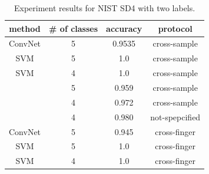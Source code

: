 \begin{table}[!ht]
	\centering
	\caption{Experiment results for NIST SD4 with two labels.}
	\label{tab.SD4_result_two_labels}
	\begin{tabular}{|c|c|c|c|}
		\hline
		\textbf{method} & \textbf{\# of classes} & \textbf{accuracy} & \textbf{protocol} \\ \hline
		ConvNet & 5 & 0.9535 & cross-sample \\ \hline
		SVM & 5 & 1.0 & cross-sample \\ \hline
		SVM & 4 & 1.0 & cross-sample \\ \hline
		\cite{cao2013fingerprint} & 5 & 0.959 & cross-sample \\ \hline
		\cite{cao2013fingerprint}& 4 & 0.972 & cross-sample \\ \hline
		\cite{wang2014fingerprint} & 4 & 0.980 & not-spepcified \\ \hline
		ConvNet & 5 & 0.945 & cross-finger \\ \hline
		SVM & 5 & 1.0 & cross-finger \\ \hline
		SVM & 4 & 1.0 & cross-finger \\ \hline
	\end{tabular}
\end{table}

